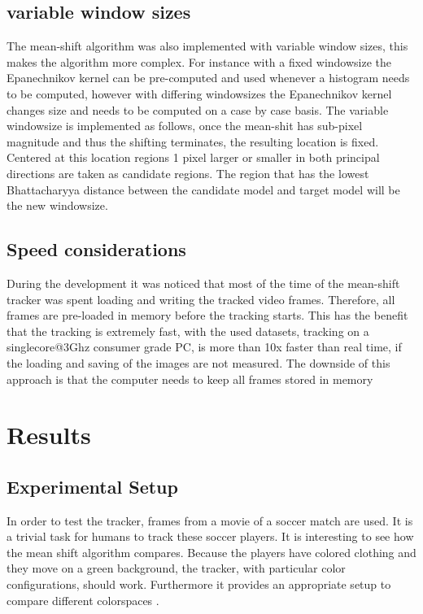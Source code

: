 \documentclass[a4paper,11pt]{article}
\begin{document}
\subsection{variable window sizes}
The mean-shift algorithm was also implemented with variable window sizes, this makes the algorithm more complex. For instance with a fixed windowsize the Epanechnikov kernel can be pre-computed and used whenever a histogram needs to be computed, however with differing windowsizes the Epanechnikov kernel changes size and needs to be computed on a case by case basis. The variable windowsize is implemented as follows, once the mean-shit has sub-pixel magnitude and thus the shifting terminates, the resulting location is fixed. Centered at this location regions 1 pixel larger or smaller in both principal directions are taken as candidate regions. The region that has the lowest Bhattacharyya distance between the candidate model and target model will be the new windowsize.     
  
\subsection{Speed considerations}
During the development it was noticed that most of the time of the mean-shift tracker was spent loading and writing the tracked video frames. Therefore, all frames are pre-loaded in memory before the tracking starts. This has the benefit that the tracking is extremely fast, with the used datasets, tracking on a singlecore@3Ghz consumer grade PC, is more than 10x faster than real time, if the loading and saving of the images are not measured. The downside of this approach is that the computer needs to keep all frames stored in memory 




\section{Results} 

	\subsection{Experimental Setup} 
	In order to test the tracker, frames from a movie of a soccer match are
	used.  It is a trivial task for humans to track these soccer players. It is
	interesting to see how the mean shift algorithm compares.  Because the
	players have colored clothing and they move on a green background, the
	tracker, with particular color configurations, should work. Furthermore it
	provides an appropriate setup to compare different colorspaces .\\
\end{document}
